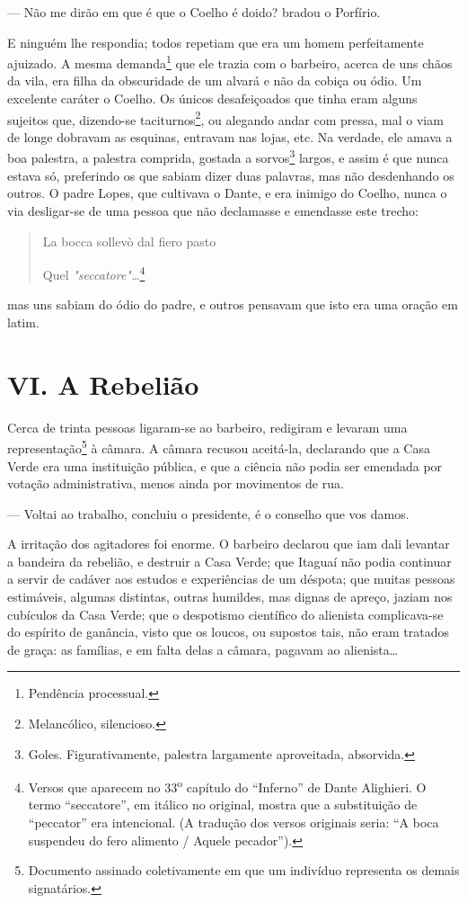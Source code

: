 --- Não me dirão em que é que o Coelho é doido? bradou o Porfírio.

E ninguém lhe respondia; todos repetiam que era um homem perfeitamente
ajuizado. A mesma demanda\footnote{Pendência processual.} que ele trazia
com o barbeiro, acerca de uns chãos da vila, era filha da obscuridade de
um alvará e não da cobiça ou ódio. Um excelente caráter o Coelho. Os
únicos desafeiçoados que tinha eram alguns sujeitos que, dizendo-se
taciturnos\footnote{Melancólico, silencioso.}, ou alegando andar com
pressa, mal o viam de longe dobravam as esquinas, entravam nas lojas,
etc. Na verdade, ele amava a boa palestra, a palestra comprida, gostada
a sorvos\footnote{Goles. Figurativamente, palestra largamente
  aproveitada, absorvida.} largos, e assim é que nunca estava só,
preferindo os que sabiam dizer duas palavras, mas não desdenhando os
outros. O padre Lopes, que cultivava o Dante, e era inimigo do Coelho,
nunca o via desligar-se de uma pessoa que não declamasse e emendasse
este trecho:

\begin{quote}
La bocca sollevò dal fiero pasto

Quel \emph{"seccatore"\ldots{}}\footnote{Versos que aparecem no
  33\textsuperscript{o} capítulo do ``Inferno'' de Dante Alighieri. O
  termo ``seccatore'', em itálico no original, mostra que a substituição
  de ``peccator'' era intencional. (A tradução dos versos originais
  seria: ``A boca suspendeu do fero alimento / Aquele pecador'').}
\end{quote}

mas uns sabiam do ódio do padre, e outros pensavam que isto era uma
oração em latim.

\chapter{VI. A Rebelião}

Cerca de trinta pessoas ligaram-se ao barbeiro, redigiram e levaram uma
representação\footnote{Documento assinado coletivamente em que um
  indivíduo representa os demais signatários.} à câmara. A câmara
recusou aceitá-la, declarando que a Casa Verde era uma instituição
pública, e que a ciência não podia ser emendada por votação
administrativa, menos ainda por movimentos de rua.

--- Voltai ao trabalho, concluiu o presidente, é o conselho que vos
damos.

A irritação dos agitadores foi enorme. O barbeiro declarou que iam dali
levantar a bandeira da rebelião, e destruir a Casa Verde; que Itaguaí
não podia continuar a servir de cadáver aos estudos e experiências de um
déspota; que muitas pessoas estimáveis, algumas distintas, outras
humildes, mas dignas de apreço, jaziam nos cubículos da Casa Verde; que
o despotismo científico do alienista complicava-se do espírito de
ganância, visto que os loucos, ou supostos tais, não eram tratados de
graça: as famílias, e em falta delas a câmara, pagavam ao
alienista\ldots{}

